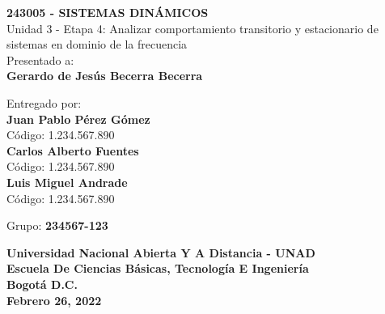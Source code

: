 \begin{titlepage}
	\begin{center}
		\Large
		\textbf{243005 - SISTEMAS DINÁMICOS}\\
		\vspace{0.5cm}
		Unidad 3 - Etapa 4: Analizar comportamiento transitorio y estacionario de sistemas en dominio de la frecuencia\\
		\vspace{1cm}
		Presentado a:\\
		\vspace{0.3cm}
		\Large
		\textbf{Gerardo de Jesús Becerra Becerra}\\	
		\vspace{0.5cm}

		\vfill

		\large
		Entregado por:\\
		\vspace{0.3cm}
		\Large
		\textbf{Juan Pablo Pérez Gómez}\\
		\vspace{0.2cm}
		\large	
		Código: 1.234.567.890\\
		\vspace{0.3cm}
		\Large
		\textbf{Carlos Alberto Fuentes}\\
		\vspace{0.2cm}
		\large	
		Código: 1.234.567.890\\
		\vspace{0.3cm}
		\Large
		\textbf{Luis Miguel Andrade}\\
		\vspace{0.2cm}
		\large	
		Código: 1.234.567.890\\
		\vspace{0.3cm}
		\vspace{1cm}

		Grupo: \textbf{234567-123}\\
		\vspace{1.0cm}

		\vfill

		\Large
		\textbf{Universidad Nacional Abierta Y A Distancia - UNAD}\\
		\vspace{0.3cm}
		\textbf{Escuela De Ciencias Básicas, Tecnología E Ingeniería}\\
		\vspace{0.3cm}
		\textbf{Bogotá D.C.}\\
		\vspace{0.3cm}
		\textbf{Febrero 26, 2022}
		\pagebreak

	\end{center}	
\end{titlepage}